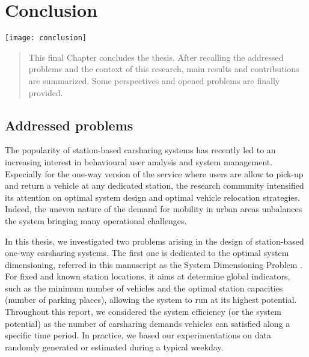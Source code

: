 \chapter{Conclusion} \label{chap:conclusion}
\minitoc
\vspace{4cm}
\begin{minipage}[c]{0.35\linewidth}
\texttt{[image: conclusion]}
\end{minipage}
\hfill
\begin{minipage}[c]{0.6\linewidth}
\begin{abstract}
This final Chapter concludes the thesis.
After recalling the addressed problems and the context of this research, main results and contributions are summarized.
Some perspectives and opened problems are finally provided.
\end{abstract}
\end{minipage}



\newpage
\section{Addressed problems}
The popularity of station-based carsharing systems has recently led to an increasing interest in behavioural user analysis and system management.
Especially for the one-way version of the service where users are allow to pick-up and return a vehicle at any dedicated station, the research community intensified its attention on optimal system design and optimal vehicle relocation strategies.
Indeed, the uneven nature of the demand for mobility in urban areas unbalances the system bringing many operational challenges.


\medskip
In this thesis, we investigated two problems arising in the design of station-based one-way carsharing systems.
The first one is dedicated to the optimal system dimensioning, referred in this manuscript as the System Dimensioning Problem {\SDP}.
For fixed and known station locations, it aims at determine global indicators, such as the minimum number of vehicles and the optimal station capacities (number of parking places), allowing the system to run at its highest potential.
Throughout this report, we considered the system efficiency (or the system potential) as the number of carsharing demands vehicles can satisfied along a specific time period.
In practice, we based our experimentations on data randomly generated or estimated during a typical weekday.%

